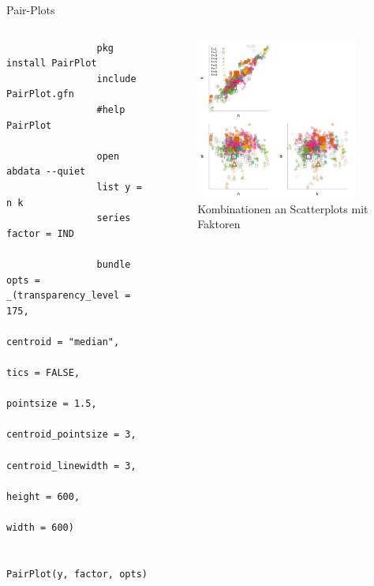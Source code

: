 \documentclass{beamer}[11pt]
\begin{document}
\begin{frame}[fragile]{Pair-Plots}
	\begin{columns}[T] %
		\scriptsize
		\begin{column}{.5\textwidth}
			\begin{verbatim}
				pkg install PairPlot
				include PairPlot.gfn
				#help PairPlot

				open abdata --quiet
				list y = n k
				series factor = IND

				bundle opts = _(transparency_level = 175,
								  centroid = "median",
								  tics = FALSE,
								  pointsize = 1.5,
								  centroid_pointsize = 3,
								  centroid_linewidth = 3,
								  height = 600,
								  width = 600)

				PairPlot(y, factor, opts)
			\end{verbatim}
		\end{column}

		\begin{column}{.5\textwidth}
			\begin{figure}
				\includegraphics[width=0.9\textwidth]{../figures/pairplot_factorized.png}
				\caption{Kombinationen an Scatterplots mit Faktoren}
			\end{figure}
	  \end{column}
	\end{columns}
\end{frame}
\end{document}
